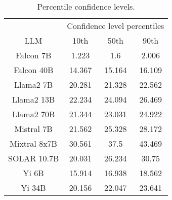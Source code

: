 \begin{table*}
\centering
\begin{tabular}{c|c|c|c}
& \multicolumn{3}{c}{Confidence level percentiles} \\ 
LLM & 10th & 50th & 90th\\ \hline
Falcon 7B & 1.223 & 1.6 & 2.006\\
Falcon 40B & 14.367 & 15.164 & 16.109\\
Llama2 7B & 20.281 & 21.328 & 22.562\\
Llama2 13B & 22.234 & 24.094 & 26.469\\
Llama2 70B & 21.344 & 23.031 & 24.922\\
Mistral 7B & 21.562 & 25.328 & 28.172\\
Mixtral 8x7B & 30.561 & 37.5 & 43.469\\
SOLAR 10.7B & 20.031 & 26.234 & 30.75\\
Yi 6B & 15.914 & 16.938 & 18.562\\
Yi 34B & 20.156 & 22.047 & 23.641\\
\hline
\end{tabular}
\caption{Percentile confidence levels.}
\label{tab:percentile_conf}
\end{table*}
